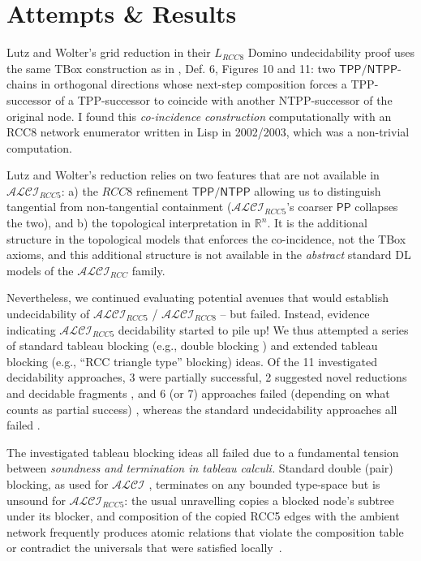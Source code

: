 \documentclass[
]{ceurart}
\theoremstyle{definition}
\newcommand{\ALCI}{\ensuremath{\mathcal{ALCI}}}
\newcommand{\ALCIRCC}[1]{\ensuremath{\mathcal{ALCI}_{\mathit{RCC#1}}}}
\newcommand{\LRCC}[1]{\ensuremath{L_{\mathit{RCC#1}}}}
\newcommand{\PP}{\ensuremath{\mathsf{PP}}}
\newcommand{\TPP}{\ensuremath{\mathsf{TPP}}}
\newcommand{\NTPP}{\ensuremath{\mathsf{NTPP}}}
\begin{document}
\section{Attempts \& Results}
\label{sec:ea-results}

Lutz and Wolter's grid reduction in their $\LRCC{8}$ Domino
undecidability proof uses the same TBox construction as in
\cite{Wessel2003}, Def. 6, Figures 10 and 11: two $\TPP/\NTPP$-chains
in orthogonal directions whose next-step composition forces a
TPP-successor of a TPP-successor to coincide with another
NTPP-successor of the original node. I found this \emph{co-incidence
construction} computationally with an RCC8 network enumerator
written in Lisp in 2002/2003, which was a non-trivial computation. 

Lutz and Wolter's reduction relies on two features that are not
available in \ALCIRCC{5}: a) the $\mathit{RCC}8$ refinement
$\TPP/\NTPP$ allowing us to distinguish tangential from non-tangential
containment (\ALCIRCC{5}'s coarser $\PP$ collapses the two), and b)
the topological interpretation in $\mathbb{R}^n$. It is the additional
structure in the topological models that enforces the co-incidence,
not the TBox axioms, and this additional structure is not available in
the \emph{abstract} standard DL models of the $\ALCIRCC{}$ family.

Nevertheless, we continued evaluating potential avenues that would
establish undecidability of $\ALCIRCC{5}$ / $\ALCIRCC{8}$ -- but
failed. Instead, evidence indicating $\ALCIRCC{5}$ decidability
started to pile up! We thus attempted a series of standard tableau
blocking (e.g., double blocking \cite{DLHandbook2007}) and extended
tableau blocking (e.g., ``RCC triangle type'' blocking) ideas.  Of the
11 investigated decidability approaches, 3 were partially successful,
2 suggested novel reductions and decidable fragments
\cite{TwoTierQuotient}, and 6 (or 7) approaches failed (depending on
what counts as partial success) \cite{ALCIRCC5Outdated}, whereas the
standard undecidability approaches all failed \cite{ALCIRCC5Repo}. 

The investigated tableau blocking ideas all failed due to a
fundamental tension between \emph{soundness and termination in tableau
calculi.} Standard double (pair) blocking, as used for \ALCI
\cite{DLHandbook2007}, terminates on any bounded type-space but is
unsound for \ALCIRCC{5}: the usual unravelling copies a blocked node's
subtree under its blocker, and composition of the copied RCC5 edges
with the ambient network frequently produces atomic relations that
violate the composition table or contradict the universals that were
satisfied locally~\cite{ALCIRCC5Outdated,StatusAfterFW}.
           
\end{document}
